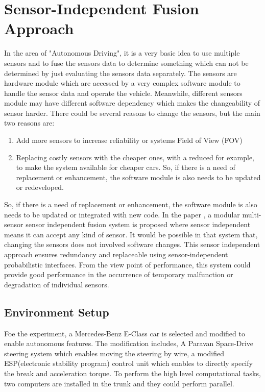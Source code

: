 \section{Sensor-Independent Fusion Approach}
In the area of "Autonomous Driving", it is a very basic idea to use multiple sensors and to fuse the sensors data to determine something which can not be determined by just evaluating the sensors data separately. The sensors are hardware module which are accessed by a very complex software module to handle the sensor data and operate the vehicle. Meanwhile, different sensors module may have different software dependency which makes the changeability of sensor harder. There could be several reasons to change the sensors, but the main two reasons are: 
\begin{enumerate}
    \item Add more sensors to increase reliability or systems Field of View (FOV)\cite{Kunz_2015}
    \item Replacing costly sensors with the cheaper ones, with a reduced for example, to make the system available for cheaper cars. So, if there is a need of replacement or enhancement, the software module is also needs to be updated or redeveloped.
\end{enumerate}
So, if there is a need of replacement or enhancement, the software module is also needs to be updated or integrated with new code. In the paper \cite{Kunz_2015}, a modular multi-sensor sensor independent fusion system is proposed where sensor independent means it can accept any kind of sensor. It would be possible in that system that, changing the sensors does not involved software changes. This sensor independent approach ensures redundancy and replaceable using sensor-independent probabilistic interfaces\cite{Kunz_2015}. From the view point of performance, this system could provide good performance in the occurrence of temporary malfunction or degradation of individual sensors.

\subsection{Environment Setup}
Foe the experiment, a Mercedes-Benz E-Class car is selected and modified to enable autonomous features. The modification includes, A Paravan Space-Drive steering system which enables moving the steering by wire, a modified ESP(electronic stability program) control unit which enables to directly specify the break and acceleration torque\cite{Kunz_2015}. To perform the high level computational tasks, two computers are installed in the trunk and they could perform parallel.


